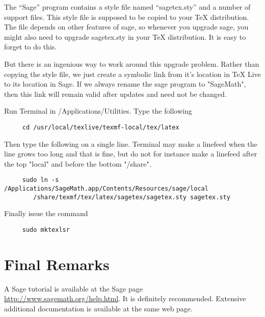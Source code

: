 \documentclass[11pt, oneside]{amsart}
\begin{document}
The ``Sage'' program contains a style file named ``sagetex.sty'' and a number of support files. This style file is supposed to be copied to your TeX distribution. The file depends on other features of sage, so whenever you upgrade sage, you might also need to upgrade sagetex.sty in your TeX distribution. It is easy to forget to do this.

But there is an ingenious way to work around this upgrade problem. Rather than copying the style file, we just
create a symbolic link from it's location in TeX Live to its location in Sage. If we always rename the sage program to "SageMath", then this link will remain valid after updates and need not be changed.

Run Terminal in /Applications/Utilities. Type the following
\begin{verbatim}
     cd /usr/local/texlive/texmf-local/tex/latex
\end{verbatim}
Then type the following on a single line. Terminal may make a linefeed when
the line  grows too long and that is fine, but do not for instance make a linefeed
after the top "local" and before the bottom "/share".
\begin{verbatim}
     sudo ln -s /Applications/SageMath.app/Contents/Resources/sage/local
        /share/texmf/tex/latex/sagetex/sagetex.sty sagetex.sty
\end{verbatim}

Finally issue the command
\begin{verbatim}		
     sudo mktexlsr
\end{verbatim}
	



\section{Final Remarks}
 
A Sage tutorial is available at the Sage page \url{http://www.sagemath.org/help.html}. It is definitely recommended. Extensive additional documentation is available at the same web page.
\end{document}
